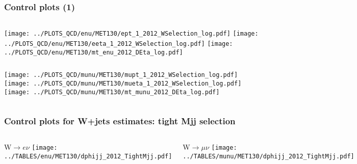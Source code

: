 \documentclass[red,compress,xcolor=table]{beamer}
\begin{document}
\begin{frame}
\frametitle{Control plots (1)}

\begin{columns}
  \texttt{[image: ../PLOTS\_QCD/enu/MET130/ept\_1\_2012\_WSelection\_log.pdf]}
  \texttt{[image: ../PLOTS\_QCD/enu/MET130/eeta\_1\_2012\_WSelection\_log.pdf]}
  \texttt{[image: ../PLOTS\_QCD/enu/MET130/mt\_enu\_2012\_DEta\_log.pdf]}
\end{columns}
\begin{columns}
  \texttt{[image: ../PLOTS\_QCD/munu/MET130/mupt\_1\_2012\_WSelection\_log.pdf]}
  \texttt{[image: ../PLOTS\_QCD/munu/MET130/mueta\_1\_2012\_WSelection\_log.pdf]}
  \texttt{[image: ../PLOTS\_QCD/munu/MET130/mt\_munu\_2012\_DEta\_log.pdf]}
\end{columns}

\end{frame}


\begin{frame}
  \frametitle{Control plots for W+jets estimates: tight Mjj selection}

\begin{columns}
  \begin{block}{W$\rightarrow e\nu$}
    \texttt{[image: ../TABLES/enu/MET130/dphijj\_2012\_TightMjj.pdf]}
  \end{block}
  \begin{block}{W$\rightarrow \mu\nu$}
    \texttt{[image: ../TABLES/munu/MET130/dphijj\_2012\_TightMjj.pdf]}
  \end{block}
\end{columns}


\end{frame}
\end{document}
